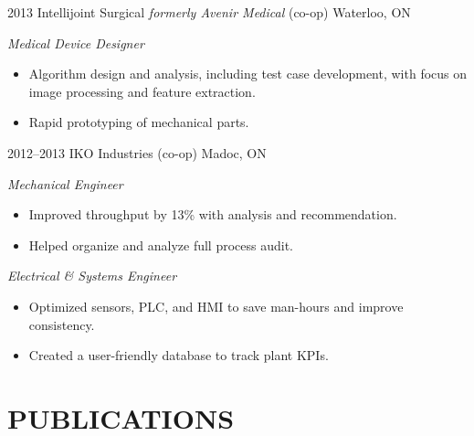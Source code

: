 \documentclass[a4paper,nocolors]{cv-friggeri-ben}
\begin{document}
\begin{entrylist}

\entry
    {2013}
    {Intellijoint Surgical {\normalfont \emph{formerly Avenir Medical} (co-op)}}
    {Waterloo, ON}
    {\emph{Medical Device Designer}
    \begin{itemize}
        \item Algorithm design and analysis, including test case development,
            with focus on image processing and feature extraction.
        \item Rapid prototyping of mechanical parts.
    \end{itemize}}

\entry
    {2012--2013}
    {IKO Industries {\normalfont (co-op)}}
    {Madoc, ON}
    {\emph{Mechanical Engineer}
    \begin{itemize}
        \item Improved throughput by 13\% with analysis and recommendation.
        \item Helped organize and analyze full process audit.
    \end{itemize}
    \emph{Electrical \& Systems Engineer}
    \begin{itemize}
        \item Optimized sensors, PLC, and HMI to save man-hours and improve
            consistency.
        \item Created a user-friendly database to track plant KPIs.
    \end{itemize}}

\end{entrylist}


\section{PUBLICATIONS}
\vspace{-4pt}


\end{document}
